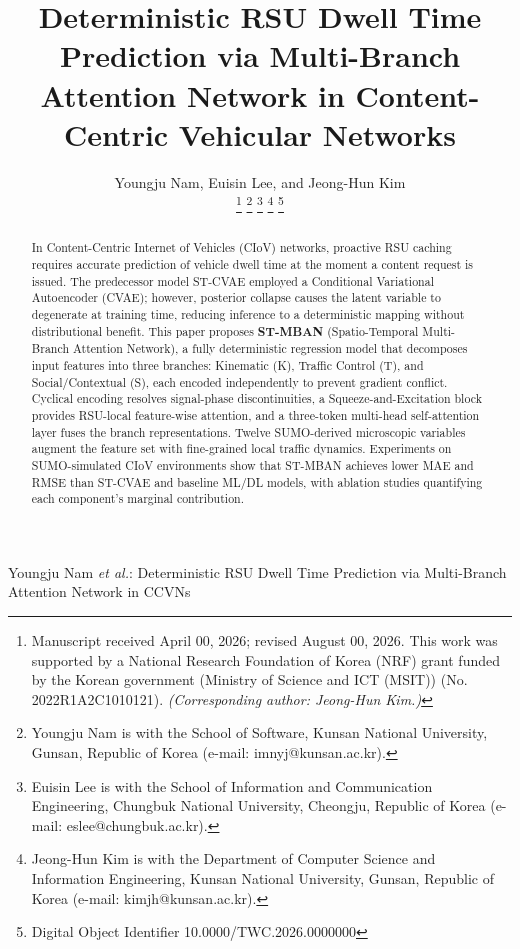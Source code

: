 \documentclass[journal]{IEEEtran}
\begin{document}
\title{Deterministic RSU Dwell Time Prediction via Multi-Branch Attention Network in Content-Centric Vehicular Networks}

\newcommand{\orcidauthorA}{0000-0003-3971-0715} %
\newcommand{\orcidauthorC}{0000-0002-0422-0647} %
\newcommand{\orcidauthorB}{0000-0001-8209-5944} %

\author{Youngju Nam, Euisin Lee, and Jeong-Hun Kim

\thanks{Manuscript received April 00, 2026; revised August 00, 2026.
This work was supported by a National Research Foundation of Korea (NRF) grant funded by the Korean government (Ministry of Science and ICT (MSIT)) (No. 2022R1A2C1010121). \textit{(Corresponding author: Jeong-Hun Kim.)}}
\thanks{Youngju Nam is with the School of Software, Kunsan National University, Gunsan, Republic of Korea (e-mail: imnyj@kunsan.ac.kr).}
\thanks{Euisin Lee is with the School of Information and Communication Engineering, Chungbuk National University, Cheongju, Republic of Korea (e-mail: eslee@chungbuk.ac.kr).}
\thanks{Jeong-Hun Kim is with the Department of Computer Science and Information Engineering, Kunsan National University, Gunsan, Republic of Korea (e-mail: kimjh@kunsan.ac.kr).}
\thanks{Digital Object Identifier 10.0000/TWC.2026.0000000}}

%
{Youngju Nam \MakeLowercase{\textit{et al.}}: Deterministic RSU Dwell Time Prediction via Multi-Branch Attention Network in CCVNs}


\maketitle

\begin{abstract}
In Content-Centric Internet of Vehicles (CIoV) networks, proactive RSU caching requires accurate prediction of vehicle dwell time at the moment a content request is issued.
The predecessor model ST-CVAE employed a Conditional Variational Autoencoder (CVAE); however, posterior collapse causes the latent variable to degenerate at training time, reducing inference to a deterministic mapping without distributional benefit.
This paper proposes \textbf{ST-MBAN} (Spatio-Temporal Multi-Branch Attention Network), a fully deterministic regression model that decomposes input features into three branches: Kinematic (K), Traffic Control (T), and Social/Contextual (S), each encoded independently to prevent gradient conflict.
Cyclical encoding resolves signal-phase discontinuities, a Squeeze-and-Excitation block provides RSU-local feature-wise attention, and a three-token multi-head self-attention layer fuses the branch representations.
Twelve SUMO-derived microscopic variables augment the feature set with fine-grained local traffic dynamics.
Experiments on SUMO-simulated CIoV environments show that ST-MBAN achieves lower MAE and RMSE than ST-CVAE and baseline ML/DL models, with ablation studies quantifying each component's marginal contribution.
\end{abstract}
\end{document}
